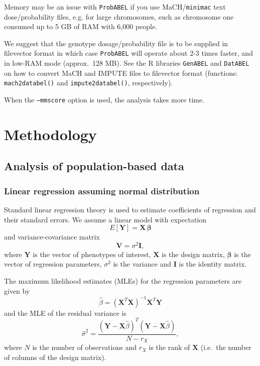 \documentclass[12pt,a4paper]{article}
\newcommand{\PA}{\texttt{ProbABEL}}
\newcommand{\GA}{\texttt{GenABEL}}
\newcommand{\DA}{\texttt{DatABEL}}
\begin{document}
Memory may be an issue with \PA{} if you use MaCH/\texttt{minimac}
text dose/probability files, e.g. for large chromosomes, such as
chromosome one consumed up to 5 GB of RAM with 6,000 people.

We suggest that the genotype dosage/probability file is to be supplied
in filevector format in which case \PA{} will operate about 2-3 times
faster, and in low-RAM mode (approx.~128 MB). See the R libraries
\GA{} and \DA{} on how to convert MaCH and IMPUTE files to filevector
format (functions: \texttt{mach2databel()} and
\texttt{impute2databel()}, respectively).

When the \texttt{--mmscore} option is used, the analysis takes
more time.

\section{Methodology}
\label{sec:methodology}
\subsection{Analysis of population-based data}
\subsubsection{Linear regression assuming normal distribution}
Standard linear regression theory is used to estimate coefficients of
regression and their standard errors. We assume a linear model with
expectation
\begin{equation}
  E[\mathbf{Y}] = \mathbf{X}\, \boldsymbol{\beta}
\label{eq:expectation}
\end{equation}
and variance-covariance matrix
$$
\mathbf{V} = \sigma^2 \mathbf{I},
$$
where $\mathbf{Y}$ is the vector of phenotypes of interest,
$\mathbf{X}$ is the design matrix, $\boldsymbol{\beta}$ is the vector
of regression parameters, $\sigma^2$ is the variance and $\mathbf{I}$
is the identity matrix.

The maximum likelihood estimates (MLEs) for the regression parameters
are given by
\begin{equation}
  \hat{\beta} = (\mathbf{X}^T \mathbf{X})^{-1} \mathbf{X}^T \mathbf{Y}
\end{equation}
and the MLE of the residual variance is
\begin{equation}
  \hat{\sigma}^2 = \frac{(\mathbf{Y} - \mathbf{X}\hat{\beta})^T
    (\mathbf{Y} - \mathbf{X}\hat{\beta})} {N-r_X},
\end{equation}
where $N$ is the number of observations and $r_X$ is the rank of
$\mathbf{X}$ (i.e.~the number of columns of the design matrix).
\end{document}
